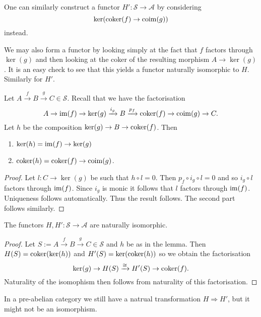 \documentclass{memoir}
\begin{document}
One can similarly construct a functor $H':\mathcal S\to\mathcal A$ by considering 
\begin{equation}
    \ker(\operatorname{coker}(f)\to\operatorname{coim}(g))
\end{equation}
instead.
\begin{remark}
    We may also form a functor by looking simply at the fact that $f$ factors through $\ker(g)$ and then looking at the coker of the resulting morphism $A\to\ker(g)$. It is an easy check to see that this yields a functor naturally isomorphic to $H$. Similarly for $H'$.
\end{remark}
\begin{lemma}
    Let $A\xrightarrow{f} B\xrightarrow{g} C\in\mathcal S$.
    Recall that we have the factorisation 
    \begin{equation}
        A\rightarrow \operatorname{im}(f) \rightarrow \ker(g)\xrightarrow{i_g} B \xrightarrow{p_f} \operatorname{coker}(f) \rightarrow \operatorname{coim}(g) \rightarrow C.
    \end{equation}
    Let $h$ be the composition $\ker(g)\to B \to\operatorname{coker}(f)$.
    Then
    \begin{enumerate}
        \item $\ker(h) = \operatorname{im}(f)\to\ker(g)$
        \item $\operatorname{coker}(h) = \operatorname{coker}(f)\to\operatorname{coim}(g)$.
    \end{enumerate}
\end{lemma}
\begin{proof}
    Let $l:C\to \ker(g)$ be such that $h\circ l = 0$.
    Then $p_f \circ i_g \circ l = 0$ and so $i_g \circ l$ factors through $\operatorname{im}(f)$.
    Since $i_g$ is monic it follows that $l$ factors through $\operatorname{im}(f)$.
    Uniqueness follows automatically.
    Thus the result follows.
    The second part follows similarly.
\end{proof}
\begin{thm}
    The functors $H,H':\mathcal S\to\mathcal A$ are naturally isomorphic.
\end{thm}
\begin{proof}
    Let $S := A\xrightarrow{f} B\xrightarrow{g} C\in\mathcal S$ and $h$ be as in the lemma.
    Then $H(S) = \operatorname{coker}(\ker(h))$ and $H'(S) = \ker(\operatorname{coker}(h))$ so we obtain the factorisation
    \begin{equation}
        \ker(g) \to H(S) \xrightarrow{\cong} H'(S) \to \operatorname{coker}(f).
    \end{equation}
    Naturality of the isomophism then follows from naturality of this factorisation.
\end{proof}
\begin{remark}
    In a pre-abelian category we still have a natrual transformation $H\Rightarrow H'$, but it might not be an isomorphism.
\end{remark}
\end{document}
